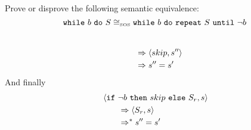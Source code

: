 \begin{exercise}{
    Prove or disprove the following semantic equivalence:
    \[ \texttt{while}\ b\ \texttt{do}\ S \cong_{\text{\tiny SOS}} \texttt{while}\ b\ \texttt{do}\ \texttt{repeat}\ S\ \texttt{until}\ \neg b  \]\vspace*{-0.6cm}
}
\begin{itemize}
\begin{itemize}
\begin{align*}
                    \\&\qquad\Rightarrow \left<skip, s''\right>
                    \\&\qquad\Rightarrow s'' = s'
                \end{align*}
                And finally
                \begin{align*}
                    &\instr{\texttt{if}\ \neg b\ \texttt{then}\ skip\ \texttt{else}\ S_r}{s}
                    \\&\qquad\Rightarrow \instr{S_r}{s}
                    \\&\qquad\Rightarrow^* s'' = s'
                \end{align*}
            \end{itemize}
    \end{itemize}
\end{exercise}
